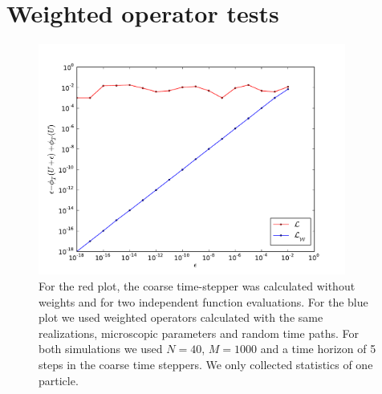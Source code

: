 \documentclass[]{article}
\title{}
\author{}
\begin{document}
\maketitle

\begin{abstract}

\end{abstract}


\section{Weighted operator tests}
\begin{figure}
\includegraphics[width=0.9\textwidth]{epsilon_dependence_M1000_N40_1dim.pdf}
\caption{For the red plot, the coarse time-stepper was calculated without weights and for two independent function evaluations. For the blue plot we used weighted operators calculated with the same realizations, microscopic parameters and random time paths. For both simulations we used $N=40$, $M=1000$ and a time horizon of 5 steps in the coarse time steppers. We only collected statistics of one particle.}
\label{fig:epsilon}
\end{figure}
\end{document}
